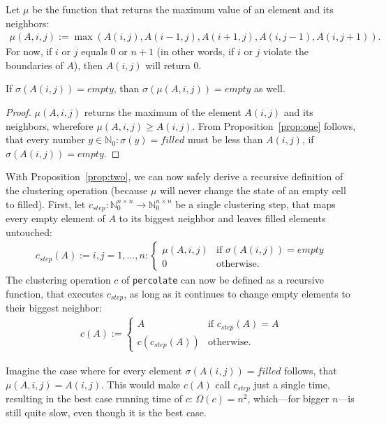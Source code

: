 \documentclass[twoside,11pt]{article}
\def\perc{\texttt{perco\-late}}
\begin{document}
Let $\mu$ be the function that returns the maximum value
of an element and its neighbors:
\begin{align*}
  \mu(A, i, j) := \max(A(i,j), A(i-1,j), A(i+1,j),
                       A(i,j-1), A(i,j+1)).
\end{align*}
For now, if $i$ or $j$ equals $0$ or $n + 1$ (in other
words, if $i$ or $j$ violate the boundaries of $A$), then
$A(i, j)$ will return $0$.

\begin{proposition}
  \label{prop:two}
  If $\sigma(A(i, j)) = empty$, than
  $\sigma(\mu(A, i, j)) = empty$ as well.
\end{proposition}

\begin{proof}
  $\mu(A, i, j)$ returns the maximum of the element
  $A(i, j)$ and its neighbors, wherefore $\mu(A, i, j) \geq
  A(i, j)$.
  From Proposition~\ref{prop:one} follows, that every
  number $y \in \mathbb{N}_0: \sigma(y) = filled$ must be
  less than $A(i, j)$, if $\sigma(A(i,j)) = empty$.
\end{proof}

With Proposition~\ref{prop:two}, we can now safely derive
a recursive definition of the clustering operation (because
$\mu$ will never change the state of an empty cell to
filled).
First, let $c_{step}:\mathbb{N}_0^{n \times n} \rightarrow
\mathbb{N}_0^{n \times n}$ be a single clustering step,
that maps every empty element of $A$ to its biggest
neighbor and leaves filled elements untouched:
\begin{align*}
  c_{step}(A) := i,j=1,\dots,n: \begin{cases}
    \mu(A, i, j) &\text{if } \sigma(A(i, j)) = empty \\
    0 &\text{otherwise}.
  \end{cases}
\end{align*}
The clustering operation $c$ of \perc{} can now be defined
as a recursive function, that executes $c_{step}$, as long
as it continues to change empty elements to their biggest
neighbor:
\begin{align*}
  c(A) := \begin{cases}
    A &\text{if } c_{step}(A) = A \\
    c(c_{step}(A)) &\text{otherwise}.
  \end{cases}
\end{align*}

Imagine the case where for every element
$\sigma(A(i,j)) = filled$ follows, that
$\mu(A, i, j) = A(i, j)$.
This would make $c(A)$ call $c_{step}$ just a single time,
resulting in the best case running time of $c$:
$\Omega(c) = n^2$, which---for bigger $n$---is still quite
slow, even though it is the best case.
\end{document}
